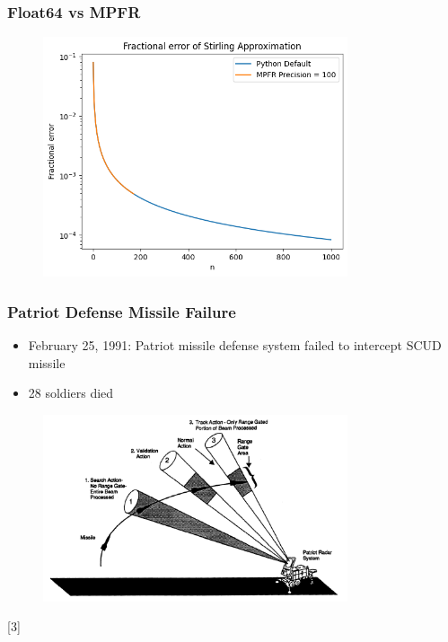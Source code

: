 \documentclass[10pt]{beamer}
\begin{document}
\begin{frame}
    \frametitle{Float64 vs MPFR}
    \begin{figure}
        \centering
        \includegraphics[width=0.8\textwidth]{fractional_error.png}
    \end{figure}
\end{frame}

\begin{frame}
    \frametitle{Patriot Defense Missile Failure}
    \begin{itemize}
        \item February 25, 1991: Patriot missile defense system failed to intercept SCUD missile
        \item 28 soldiers died
    \end{itemize}
    \begin{figure}
        \centering
        \includegraphics[width=0.8\textwidth]{rangegate.png}
    \end{figure}
    [3]
\end{frame}
\end{document}
